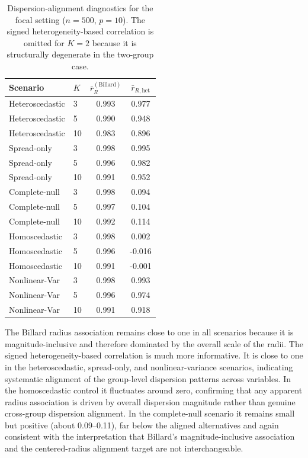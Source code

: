 \documentclass[preprint, times, 12pt, authoryear]{elsarticle}
\begin{document}
\begin{table}[ht]
	\centering
	\caption{Dispersion-alignment diagnostics for the focal setting ($n=500$, $p=10$). The signed heterogeneity-based correlation is omitted for $K=2$ because it is structurally degenerate in the two-group case.}
	\label{tab:sim_level_v}
	\begin{tabular}{llcc}
		\toprule
		Scenario & $K$ & $\bar r_R^{(\mathrm{Billard})}$ & $\bar r_{R,\mathrm{het}}$ \\
		\midrule
		Heteroscedastic & 3  & 0.993 & 0.977 \\
		Heteroscedastic & 5  & 0.990 & 0.948 \\
		Heteroscedastic & 10 & 0.983 & 0.896 \\
		\midrule
		Spread-only     & 3  & 0.998 & 0.995 \\
		Spread-only     & 5  & 0.996 & 0.982 \\
		Spread-only     & 10 & 0.991 & 0.952 \\
		\midrule
		Complete-null   & 3  & 0.998 & 0.094 \\
		Complete-null   & 5  & 0.997 & 0.104 \\
		Complete-null   & 10 & 0.992 & 0.114 \\
		\midrule
		Homoscedastic   & 3  & 0.998 & 0.002 \\
		Homoscedastic   & 5  & 0.996 & -0.016 \\
		Homoscedastic   & 10 & 0.991 & -0.001 \\
		\midrule
		Nonlinear-Var   & 3  & 0.998 & 0.993 \\
		Nonlinear-Var   & 5  & 0.996 & 0.974 \\
		Nonlinear-Var   & 10 & 0.991 & 0.918 \\
		\bottomrule
	\end{tabular}
\end{table}

The Billard radius association remains close to one in all scenarios because it is magnitude-inclusive and therefore dominated by the overall scale of the radii. The signed heterogeneity-based correlation is much more informative. It is close to one in the heteroscedastic, spread-only, and nonlinear-variance scenarios, indicating systematic alignment of the group-level dispersion patterns across variables. In the homoscedastic control it fluctuates around zero, confirming that any apparent radius association is driven by overall dispersion magnitude rather than genuine cross-group dispersion alignment. In the complete-null scenario it remains small but positive (about 0.09--0.11), far below the aligned alternatives and again consistent with the interpretation that Billard's magnitude-inclusive association and the centered-radius alignment target are not interchangeable.
\end{document}

